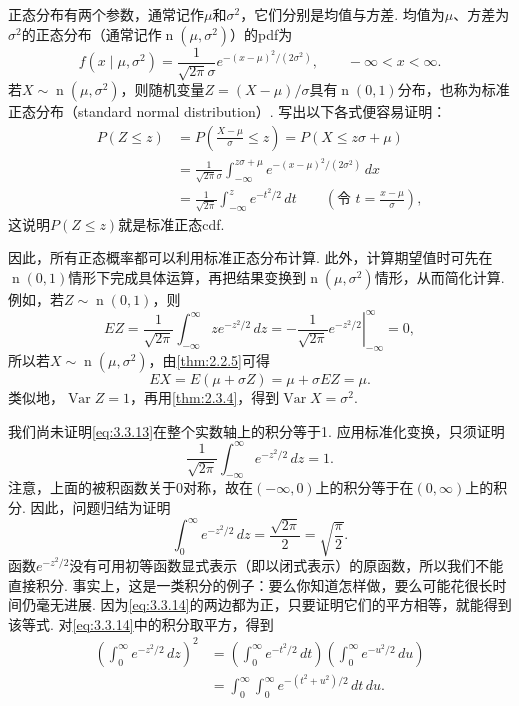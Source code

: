 正态分布有两个参数，通常记作$\mu$和$\sigma^2$，它们分别是均值与方差. 均值为$\mu$、方差为$\sigma^2$的正态分布（通常记作$\operatorname n(\mu,\sigma^2)$）的pdf为
\begin{equation}\label{eq:3.3.13}
f(x\mid\mu,\sigma^2)=\frac1{\sqrt{2\pi}\sigma}e^{-(x-\mu)^2/(2\sigma^2)},\qquad-\infty<x<\infty.
\end{equation}
若$X\sim\operatorname n(\mu,\sigma^2)$，则随机变量$Z=(X-\mu)/\sigma$具有$\operatorname n(0,1)$分布，也称为标准正态分布（standard normal distribution）. 写出以下各式便容易证明：
\begin{align*}
P(Z\le z)&=P\left(\frac{X-\mu}\sigma\le z\right)=P(X\le z\sigma+\mu)\\
&=\frac1{\sqrt{2\pi}\sigma}\int_{-\infty}^{z\sigma+\mu}e^{-(x-\mu)^2/(2\sigma^2)}\,dx\\
&=\frac1{\sqrt{2\pi}}\int_{-\infty}^z e^{-t^2/2}\,dt\qquad\left(\text{令 }t=\frac{x-\mu}\sigma\right),
\end{align*}
这说明$P(Z\le z)$就是标准正态cdf.

因此，所有正态概率都可以利用标准正态分布计算. 此外，计算期望值时可先在$\operatorname n(0,1)$情形下完成具体运算，再把结果变换到$\operatorname n(\mu,\sigma^2)$情形，从而简化计算. 例如，若$Z\sim\operatorname n(0,1)$，则
$$EZ=\frac1{\sqrt{2\pi}}\int_{-\infty}^\infty ze^{-z^2/2}\,dz=\left.-\frac1{\sqrt{2\pi}}e^{-z^2/2}\right|_{-\infty}^\infty=0,$$
所以若$X\sim\operatorname n(\mu,\sigma^2)$，由\autoref{thm:2.2.5}可得
$$EX=E(\mu+\sigma Z)=\mu+\sigma EZ=\mu.$$
类似地，$\operatorname{Var}Z=1$，再用\autoref{thm:2.3.4}，得到$\operatorname{Var}X=\sigma^2$.

我们尚未证明\eqref{eq:3.3.13}在整个实数轴上的积分等于1. 应用标准化变换，只须证明
$$\frac1{\sqrt{2\pi}}\int_{-\infty}^\infty e^{-z^2/2}\,dz=1.$$
注意，上面的被积函数关于0对称，故在$(-\infty,0)$上的积分等于在$(0,\infty)$上的积分. 因此，问题归结为证明
\begin{equation}\label{eq:3.3.14}
\int_0^\infty e^{-z^2/2}\,dz=\frac{\sqrt{2\pi}}2=\sqrt{\frac\pi2}.
\end{equation}
函数$e^{-z^2/2}$没有可用初等函数显式表示（即以闭式表示）的原函数，所以我们不能直接积分. 事实上，这是一类积分的例子：要么你知道怎样做，要么可能花很长时间仍毫无进展. 因为\eqref{eq:3.3.14}的两边都为正，只要证明它们的平方相等，就能得到该等式. 对\eqref{eq:3.3.14}中的积分取平方，得到
\begin{align*}
\left(\int_0^\infty e^{-z^2/2}\,dz\right)^2
&=\left(\int_0^\infty e^{-t^2/2}\,dt\right)\left(\int_0^\infty e^{-u^2/2}\,du\right)\\
&=\int_0^\infty\int_0^\infty e^{-(t^2+u^2)/2}\,dt\,du.
\end{align*}


